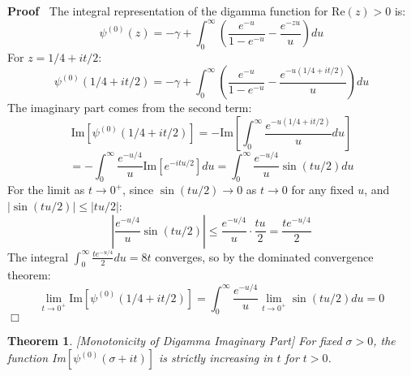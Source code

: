 \documentclass{article}
\newenvironment{proof}{\noindent\textbf{Proof\ }}{\hspace*{\fill}$\Box$\medskip}
\newtheorem{theorem}{Theorem}
\begin{document}
\begin{proof}
  The integral representation of the digamma function for Re$(z) > 0$ is:
  \begin{equation}
    \psi^{(0)} (z) = - \gamma + \int_0^{\infty} \left( \frac{e^{- u}}{1 - e^{-
    u}} - \frac{e^{- zu}}{u} \right) du
  \end{equation}
  For $z = 1 / 4 + it / 2$:
  \begin{equation}
    \psi^{(0)}  (1 / 4 + it / 2) = - \gamma + \int_0^{\infty} \left(
    \frac{e^{- u}}{1 - e^{- u}} - \frac{e^{- u (1 / 4 + it / 2)}}{u} \right)
    du
  \end{equation}
  The imaginary part comes from the second term:
  \begin{equation}
    \text{Im} [\psi^{(0)} (1 / 4 + it / 2)] = - \text{Im} \left[
    \int_0^{\infty} \frac{e^{- u (1 / 4 + it / 2)}}{u} du \right]
  \end{equation}
  \begin{equation}
    = - \int_0^{\infty} \frac{e^{- u / 4}}{u} \text{Im} [e^{- itu / 2}] du =
    \int_0^{\infty} \frac{e^{- u / 4}}{u} \sin (tu / 2) du
  \end{equation}
  For the limit as $t \to 0^+$, since $\sin (tu / 2) \to 0$ as $t \to 0$ for
  any fixed $u$, and $| \sin (tu / 2) | \leq |tu / 2|$:
  \begin{equation}
    \left| \frac{e^{- u / 4}}{u} \sin (tu / 2) \right| \leq \frac{e^{- u /
    4}}{u} \cdot \frac{tu}{2} = \frac{te^{- u / 4}}{2}
  \end{equation}
  The integral $\int_0^{\infty} \frac{te^{- u / 4}}{2} du = 8 t$ converges, so
  by the dominated convergence theorem:
  \begin{equation}
    \lim_{t \to 0^+} \text{Im} [\psi^{(0)} (1 / 4 + it / 2)] = \int_0^{\infty}
    \frac{e^{- u / 4}}{u} \lim_{t \to 0^+} \sin (tu / 2) du = 0
  \end{equation}
\end{proof}

\begin{theorem}
  \label{monotonicity}[Monotonicity of Digamma Imaginary Part] For fixed
  $\sigma > 0$, the function Im$[\psi^{(0)} (\sigma + it)]$ is strictly
  increasing in $t$ for $t > 0$.
\end{theorem}
\end{document}
